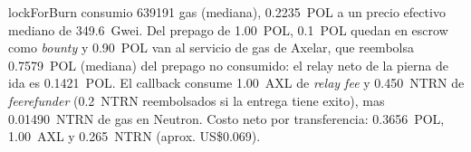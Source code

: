 %
%
lockForBurn consumio 639191 gas (mediana), 0.2235~POL a un precio efectivo mediano de
349.6~Gwei. Del prepago de 1.00~POL, 0.1~POL quedan en escrow como
\emph{bounty} y 0.90~POL van al servicio de gas de Axelar, que reembolsa
0.7579~POL (mediana) del prepago no consumido: el relay neto de la pierna de ida es
0.1421~POL. El callback consume 1.00~AXL de \emph{relay fee} y 0.450~NTRN de
\emph{feerefunder} (0.2~NTRN reembolsados si la entrega tiene exito), mas
0.01490~NTRN de gas en Neutron. Costo neto por transferencia: 0.3656~POL,
1.00~AXL y 0.265~NTRN (aprox. US\$0.069).
